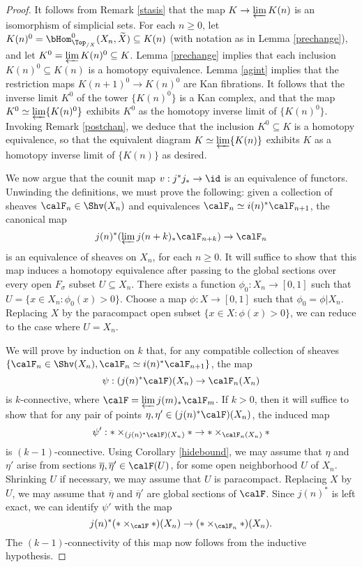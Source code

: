 \begin{proof}
It follows from Remark \ref{stasis} that the map $K \rightarrow \varprojlim K(n)$ is
an isomorphism of simplicial sets. For each $n \geq 0$, let 
$K(n)^{0} = \bHom^{0}_{ \Top_{/X}}( X_n, \widetilde{X} ) \subseteq K(n)$
(with notation as in Lemma \ref{prechange}), and let $K^{0} = \varprojlim K(n)^{0} \subseteq K$.
Lemma \ref{prechange} implies that each inclusion $K(n)^{0} \subseteq K(n)$ is a homotopy equivalence. Lemma \ref{agint} implies that the restriction maps
$K(n+1)^{0} \rightarrow K(n)^{0}$ are Kan fibrations. It follows that the inverse limit $K^0$ of the tower
$\{ K(n)^{0} \}$ is a Kan complex, and that the map
$K^0 \simeq \varprojlim \{ K(n)^{0} \}$ exhibits $K^0$ as the homotopy inverse limit of
$\{ K(n)^{0} \}$. Invoking Remark \ref{postchan}, we deduce that the inclusion $K^0 \subseteq K$
is a homotopy equivalence, so that the equivalent diagram $K \simeq \varprojlim \{ K(n) \}$ exhibits
$K$ as a homotopy inverse limit of $\{ K(n) \}$ as desired.

We now argue that the counit map $v: j^{\ast} j_{\ast} \rightarrow \id$ is an equivalence of functors.
Unwinding the definitions, we must prove the following: given a collection of sheaves
$\calF_{n} \in \Shv(X_n)$ and equivalences $\calF_{n} \simeq i(n)^{\ast} \calF_{n+1}$, 
the canonical map
$$ j(n)^{\ast}( \varprojlim j(n+k)_{\ast} \calF_{n+k}) \rightarrow \calF_n$$
is an equivalence of sheaves on $X_{n}$, for each $n \geq 0$. It will suffice to show that this map induces a homotopy equivalence after passing to the global sections over every open
$F_{\sigma}$ subset $U \subseteq X_n$. There exists a function $\phi_0: X_n \rightarrow [0,1]$ such that
$U = \{ x \in X_n: \phi_0(x) > 0 \}$. Choose a map $\phi: X \rightarrow [0,1]$ such that
$\phi_0 = \phi| X_n$. Replacing $X$ by the paracompact open subset
$\{ x \in X: \phi(x) > 0 \}$, we can reduce to the case where $U = X_n$. 

We will prove by induction on $k$ that, for any compatible collection of sheaves
$\{ \calF_{n} \in \Shv(X_n), \calF_n \simeq i(n)^{\ast} \calF_{n+1} \}$, the map 
$$ \psi: (j(n)^{\ast} \calF)(X_n) \rightarrow \calF_n(X_n)$$
is $k$-connective, where $\calF = \varprojlim j(m)_{\ast} \calF_m$.
If $k > 0$, then it will suffice to show that for any pair of points
$\eta, \eta' \in (j(n)^{\ast} \calF)(X_n)$, the induced map
$$ \psi': \ast \times_{ (j(n)^{\ast} \calF)(X_n) } \ast \rightarrow
\ast \times_{ \calF_n(X_n)} \ast$$
is $(k-1)$-connective. Using Corollary \ref{hidebound}, we may assume that
$\eta$ and $\eta'$ arise from sections $\overline{\eta}, \overline{\eta}' \in
\calF(U)$, for some open neighborhood $U$ of $X_n$. Shrinking $U$ if necessary, we may assume that $U$ is paracompact. Replacing $X$ by $U$, we may assume that $\overline{\eta}$ and
$\overline{\eta}'$ are global sections of $\calF$. Since $j(n)^{\ast}$ is left exact, we can identify
$\psi'$ with the map
$$ j(n)^{\ast} ( \ast \times_{\calF} \ast)(X_n) \rightarrow ( \ast \times_{\calF_n} \ast)(X_n).$$
The $(k-1)$-connectivity of this map now follows from the inductive hypothesis.


\end{proof}
